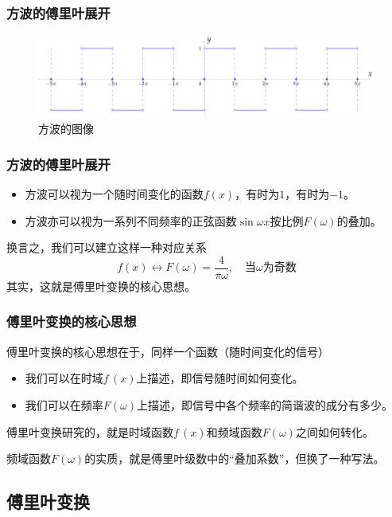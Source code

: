 \begin{frame}
    \frametitle{方波的傅里叶展开}
    \begin{figure}
        \includegraphics[width=14cm]{image/RecWave.pdf}
        \caption{方波的图像}
    \end{figure}
\end{frame}

\begin{frame}
    \frametitle{方波的傅里叶展开}
    \begin{itemize}
        \item 方波可以视为一个随时间变化的函数$f(x)$，有时为$1$，有时为$-1$。
        \item 方波亦可以视为一系列不同频率的正弦函数$\sin\omega x$按比例$F(\omega)$的叠加。
    \end{itemize}

    换言之，我们可以建立这样一种对应关系
    \begin{equation}
        f(x)\leftrightarrow F(\omega)=\frac{4}{\pi\omega},\quad\text{当$\omega$为奇数}
    \end{equation}
    其实，这就是傅里叶变换的核心思想。
\end{frame}

\begin{frame}
    \frametitle{傅里叶变换的核心思想}
    傅里叶变换的核心思想在于，同样一个函数（随时间变化的信号）
    \begin{itemize}
        \item 我们可以在时域$f\,(x)$上描述，即信号随时间如何变化。
        \item 我们可以在频率$F(\omega)$上描述，即信号中各个频率的简谐波的成分有多少。
    \end{itemize}
    傅里叶变换研究的，就是时域函数$f\,(x)$和频域函数$F(\omega)$之间如何转化。

    频域函数$F(\omega)$的实质，就是傅里叶级数中的“叠加系数”，但换了一种写法。
\end{frame}

\subsection{傅里叶变换}

